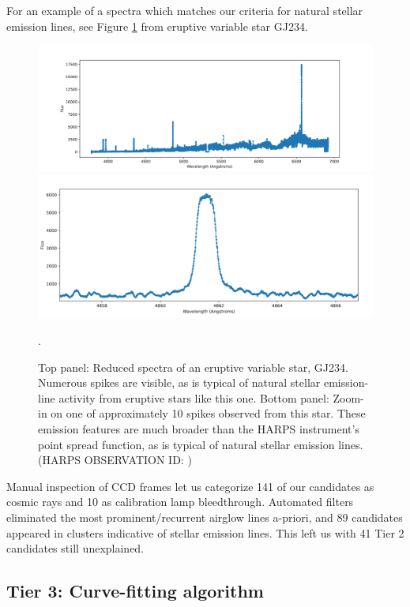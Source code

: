 \documentclass[twocolumn]{aastex701}
\begin{document}
For an example of a spectra which matches our criteria for natural stellar emission lines, see Figure \ref{fig:eruptivevariablestar}  from eruptive variable star GJ234.

\begin{figure}
    \centering
    \includegraphics[width=\textwidth]{eruptive_variable_star_reduced_spectrum-1.png}
    \includegraphics[width=\textwidth]{eruptivevariablestarbroadpeak.png}
    \caption{Top panel: Reduced spectra of an eruptive variable star, GJ234. Numerous spikes are visible, as is typical of natural stellar emission-line activity from eruptive stars like this one.  Bottom panel: Zoom-in on one of approximately 10 spikes observed from this star. These emission features are much broader than the HARPS instrument's point spread function, as is typical of natural stellar emission lines. (HARPS OBSERVATION ID: )}.
    \label{fig:eruptivevariablestar}
\end{figure}

Manual inspection of CCD frames let us categorize 141 of our candidates as cosmic rays and 10 as calibration lamp bleedthrough. Automated filters eliminated the most prominent/recurrent airglow lines a-priori, and 89 candidates appeared in clusters indicative of stellar emission lines. This left us with 41 Tier 2 candidates still unexplained.

\subsection{Tier 3: Curve-fitting algorithm}
\label{s:curvefit}
\end{document}
